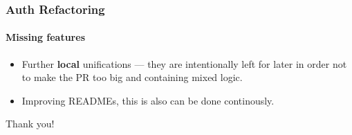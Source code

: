 \documentclass{beamer}
\begin{document}
\begin{frame}
    \frametitle{Auth Refactoring}
    \framesubtitle{Missing features}
    \begin{center}
        \begin{itemize}
            \item Further \textbf{local} unifications — they are intentionally left for later in order
             not to make the PR too big and containing mixed logic.
            \item Improving READMEs, this is also can be done continously.
        \end{itemize}
    \end{center}
\end{frame}

\begin{frame}
    \begin{center}
        Thank you!
    \end{center}
\end{frame}
\end{document}
